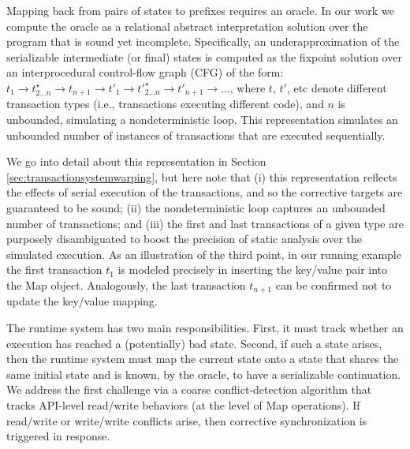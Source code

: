 Mapping back from pairs of states to prefixes requires an oracle. In our work we compute the oracle as a relational abstract interpretation solution over the program that is sound yet incomplete. Specifically, an underapproximation of the serializable intermediate (or final) states is computed as the fixpoint solution over an interprocedural control-flow graph (CFG) of the form: 
	$t_1 \rightarrow t^\star_{2 \ldots n} \rightarrow t_{n+1} \rightarrow t'_1 \rightarrow t'^\star_{2 \ldots n} \rightarrow t'_{n+1} \rightarrow \ldots$,
where $t$, $t'$, etc denote different transaction types (i.e., transactions executing different code), and $n$ is unbounded, simulating a nondeterministic loop. This representation simulates an unbounded number of instances of transactions that are executed sequentially.

We go into detail about this representation in Section \ref{sec:transactionsystemwarping}, but here note that (i) this representation reflects the effects of serial execution of the transactions, and so the corrective targets are guaranteed to be sound; (ii) the nondeterministic loop captures an unbounded number of transactions; and (iii) the first and last transactions of a given type are purposely disambiguated to boost the precision of static analysis over the simulated execution.
%
As an illustration of the third point, in our running example the first transaction $t_1$ is modeled precisely in inserting the key/value pair into the {\sf Map} object. Analogously, the last transaction $t_{n+1}$ can be confirmed not to update the key/value mapping.

%
The runtime system has two main responsibilities. First, it must track whether an execution has reached a (potentially) bad state. Second, if such a state arises, then the runtime system must map the current state onto a state that shares the same initial state and is known, by the oracle, to have a serializable continuation. 
%
We address the first challenge via a coarse conflict-detection algorithm that tracks API-level read/write behaviors (at the level of {\sf Map} operations). If read/write or write/write conflicts arise, then corrective synchronization is triggered in response. 


